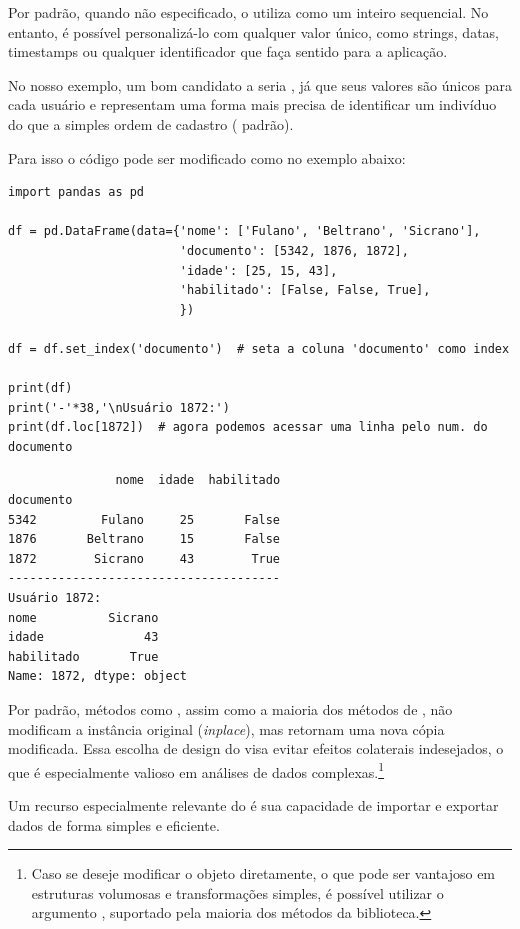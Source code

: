 Por padrão, quando não especificado, o  utiliza como  um inteiro sequencial.
No entanto, é possível personalizá-lo com qualquer valor único, como strings, datas, timestamps ou qualquer identificador que
faça sentido para a aplicação.

No nosso exemplo, um bom candidato a  seria , já que seus valores são únicos para
cada usuário e representam uma forma mais precisa de identificar um indivíduo do que a simples ordem de
cadastro ( padrão).

Para isso o código pode ser modificado como no exemplo abaixo:
\begin{verbatim}
import pandas as pd

df = pd.DataFrame(data={'nome': ['Fulano', 'Beltrano', 'Sicrano'],
                        'documento': [5342, 1876, 1872],
                        'idade': [25, 15, 43],
                        'habilitado': [False, False, True],
                        })

df = df.set_index('documento')  # seta a coluna 'documento' como index

print(df)
print('-'*38,'\nUsuário 1872:')
print(df.loc[1872])  # agora podemos acessar uma linha pelo num. do documento
\end{verbatim}
\begin{verbatim}
               nome  idade  habilitado
documento
5342         Fulano     25       False
1876       Beltrano     15       False
1872        Sicrano     43        True
--------------------------------------
Usuário 1872:
nome          Sicrano
idade              43
habilitado       True
Name: 1872, dtype: object
\end{verbatim}

Por padrão, métodos como , assim como a maioria dos métodos de , não modificam a instância original (\emph{inplace}), mas retornam uma nova cópia modificada. Essa escolha de design do  visa evitar efeitos colaterais indesejados, o que é especialmente valioso em análises de dados complexas.\footnote{Caso se deseje modificar o objeto diretamente, o que pode ser vantajoso em estruturas volumosas e transformações simples, é possível utilizar o argumento , suportado pela maioria dos métodos da biblioteca.}



Um recurso especialmente relevante do  é sua capacidade de importar e exportar dados 
de forma simples e eficiente.

